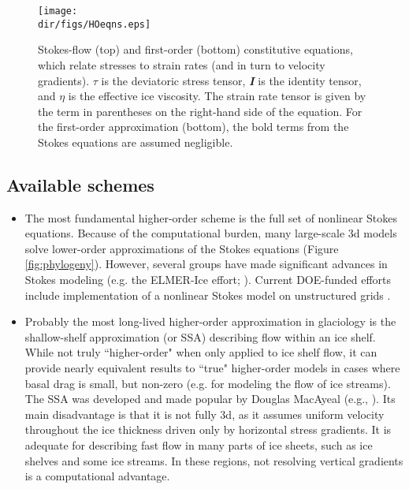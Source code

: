 \begin{figure}
  \begin{center}
    \texttt{[image: \\dir/figs/HOeqns.eps]}
   \end{center}
  \caption{Stokes-flow (top) and first-order (bottom) constitutive equations, which relate stresses to strain rates (and in turn to velocity gradients). \textbf{$\tau$} is the deviatoric stress tensor, \textit{\textbf{I}} is the identity tensor, and $\eta$ is the effective ice viscosity. The strain rate tensor is given by the term in parentheses on the right-hand side of the equation. For the first-order approximation (bottom), the bold terms from the Stokes equations are assumed negligible.}
  \label{fig:hoeqns}
\end{figure} 

\subsection{Available schemes}

\begin{itemize}
\item The most fundamental higher-order scheme is the full set of nonlinear Stokes equations. Because of the computational burden, many large-scale 3d models solve lower-order approximations of the Stokes equations (Figure \ref{fig:phylogeny}). However, several groups have made significant advances in Stokes modeling
(e.g. the ELMER-Ice effort; \citet{gagliardini:2013iv}). 
Current DOE-funded efforts include implementation of a nonlinear Stokes model on unstructured grids \citep{Leng:2012ia}.
\end{itemize}

\begin{itemize}
\item 
Probably the most long-lived higher-order approximation in glaciology is the shallow-shelf approximation (or SSA) describing flow within an ice shelf. While not truly ``higher-order" when only applied to ice shelf flow, it can provide nearly equivalent results to ``true" higher-order models in cases where basal drag is small, but non-zero (e.g. for modeling the flow of ice streams). The SSA was developed and made popular by Douglas MacAyeal (e.g., \citet{Macayeal:1989uo}). 
Its main disadvantage is that it is not fully 3d, as it assumes uniform velocity throughout the ice thickness driven only by horizontal stress gradients. It is adequate for describing fast flow in many parts of ice sheets, such as ice shelves and some ice streams. In these regions, not resolving vertical gradients is a computational advantage.   
\end{itemize}

